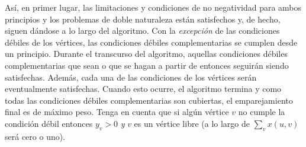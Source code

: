 \documentclass[10pt,a5paper]{book}
\begin{document}
Así, en primer lugar, las limitaciones y condiciones de no negatividad para ambos principios y los problemas de doble naturaleza están satisfechos y, de hecho, siguen dándose a lo largo del algoritmo. Con la \emph{excepción} de las condiciones débiles de los vértices, las condiciones débiles complementarias se cumplen desde un principio. Durante el transcurso del algoritmo, aquellas condiciones débiles complementarias que sean o que se hagan a partir de entonces seguirán siendo satisfechas. Además, cada una de las condiciones de los vértices serán eventualmente satisfechas. Cuando esto ocurre, el algoritmo termina y como todas las condiciones débiles complementarias son cubiertas, el emparejamiento final es de máximo peso. Tenga en cuenta que si algún vértice $v$ no cumple la condición débil entonces $y_v > 0$ \emph{y} $v$ es un vértice libre (a lo largo de $\sum_v x(u,v)$ será cero o uno).
\end{document}
